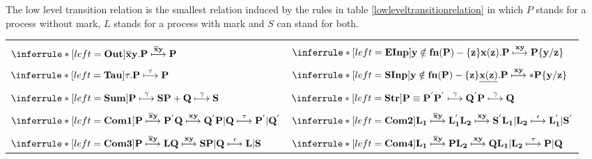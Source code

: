 \begin{definition}
  The low level transition relation is the smallest relation induced by the rules in table \ref{lowleveltransitionrelation} in which $P$ stands for a process without mark, $L$ stands for a process with mark and $S$ can stand for both. 
  \begin{table}
    \begin{tabular}{ll}
	  \hline\\
	  $\inferrule* [left=\bf{Out}]{
	  }{
	    \overline{x}y.P \stackrel{\overline{x}y}{\longmapsto} P
	  }$
	&
	  $\inferrule* [left=\bf{EInp}]{
	    y\notin fn(P)-\{z\}
	  }{
	    x(z).P \stackrel{xy}{\longmapsto} P\{y/z\}
	  }$
      \\\\
	  $\inferrule* [left=\bf{Tau}]{
	  }{
	    \tau.P \stackrel{\tau}{\longmapsto} P
	  }$
	&
	  $\inferrule* [left=\bf{SInp}]{
 	      y\notin fn(P)-\{z\}
	  }{
	    \underline{x(z)}.P \stackrel{xy}{\longmapsto} * P\{y/z\}
	  }$
      \\\\
	  $\inferrule* [left=\bf{Sum}]{
	    P \stackrel{\gamma}{\longmapsto} S
	  }{
	    P+Q \stackrel{\gamma}{\longmapsto} S
	  }$
	&
	  $\inferrule* [left=\bf{Str}]{
	      P\equiv P^{'}
	    \\
	      P^{'} \stackrel{\gamma}{\longmapsto} Q^{'}
	  }{
	      P \stackrel{\gamma}{\longmapsto} Q
	  }$
      \\\\
	  $\inferrule* [left=\bf{Com1}]{
	      P \stackrel{\overline{x}y}{\longmapsto} P^{'}
	    \\
	      Q \stackrel{xy}{\longmapsto} Q^{'}
	  }{
	    P|Q \stackrel{\tau}{\longmapsto} P^{'}|Q^{'}
	  }$
	&
	  $\inferrule* [left=\bf{Com2}]{
	      L_{1} \stackrel{\overline{x}y}{\longmapsto} L_{1}^{'}
	    \\
	      L_{2} \stackrel{xy}{\longmapsto} S^{'}
	  }{
	    L_{1}|L_{2} \stackrel{\epsilon}{\longmapsto} L_{1}^{'}|S^{'}
	  }$
      \\\\
	  $\inferrule* [left=\bf{Com3}]{
	      P \stackrel{\overline{x}y}{\longmapsto} L
	    \\
	      Q \stackrel{xy}{\longmapsto} S
	  }{
	    P|Q \stackrel{\epsilon}{\longmapsto} L|S
	  }$
	&
	  $\inferrule* [left=\bf{Com4}]{
	      L_{1} \stackrel{\overline{x}y}{\longmapsto} P
	    \\
	      L_{2} \stackrel{xy}{\longmapsto} Q
	  }{
	    L_{1}|L_{2} \stackrel{\tau}{\longmapsto} P|Q
	  }$

\end{tabular}
\end{table}
\end{definition}
